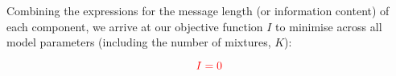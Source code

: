 \documentclass{elsarticle}
\newcommand{\todo}[1]{\textcolor{red}{#1}}
\newcommand{\vect}[1]{\boldsymbol{\mathbf{#1}}}
\def\cov{C}
\def\veccov{\vect{\cov}}
\def\vectheta{\vect{\theta}}
\def\datum{y}
\def\data{\vect{\datum}}
\begin{document}
Combining the expressions for the message length (or information content) of
each component, we arrive at our objective function $I$ to minimise across 
all model parameters (including the number of mixtures, $K$):

\begin{equation}
\todo{I = 0}
\end{equation}



\end{document}
